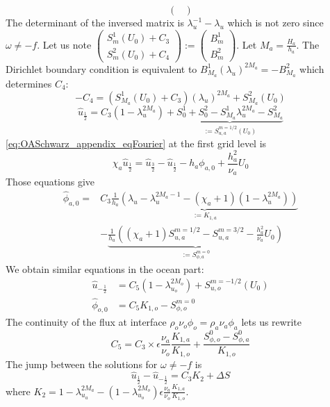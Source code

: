 \begin{itemize}
\begin{equation}
\begin{pmatrix}
	\end{pmatrix}
\end{equation}
The determinant of the inversed matrix is
$\lambda_u^{-1} - \lambda_u$ which is not zero since
$\omega\neq -f$.
Let us note 
$\begin{pmatrix}
	S_m^1(U_0) + {C}_3\\
	S_m^2(U_0) + {C}_4
\end{pmatrix}:=\begin{pmatrix}
B_m^1\\
B_m^2
\end{pmatrix}$.
Let $M_a=\frac{H_a}{h_a}$.
The Dirichlet boundary condition is equivalent to
$B_{M_a}^1 (\lambda_u)^{2M_a} = - B_{M_a}^2$ which determines
${C}_4$:
\begin{equation}
- {C}_4 = \left(S_{M_a}^1(U_0) + {C}_3\right)
	(\lambda_u)^{2M_a} + S_{M_a}^2(U_0)
\end{equation}
\begin{equation}
		\widehat{u}_{\frac{1}{2}} = {C}_3 (1 - \lambda_u^{2M_a})
	+ \underbrace{S_0^1+S_0^2 - S_{M_a}^1 \lambda_u^{2M_a}
		-S_{M_a}^2}_{:=S_{u, a}^{m=1/2}(U_0)}
\end{equation}
\eqref{eq:OASchwarz_appendix_eqFourier} at the first grid level is
\begin{equation}
	\chi_a \widehat{u}_{\frac{1}{2}} =
	\widehat{u}_{\frac{3}{2}} - \widehat{u}_{\frac{1}{2}}
	- h_a \phi_{a,0} + \frac{h^2_a}{\nu_a} U_0
\end{equation}
Those equations give
\begin{equation}
	\begin{aligned}
		\widehat{\phi}_{a,0} =&{C}_3 \underbrace{\frac{1}{h_a}
		\left(
			\lambda_u-\lambda_u^{2M_a-1}
			- (\chi_a+1)(1-\lambda_u^{2M_a})
			\right)}_{:=K_{1,a}}\\
		&-\underbrace{\frac{1}{h_a}\left((\chi_a + 1) S_{u,a}^{m=1/2}
		- S_{u,a}^{m=3/2}
		- \frac{h_a^2}{\nu_a} U_0\right)}_{:=S_{\phi,a}^{m=0}}
	\end{aligned}
\end{equation}
We obtain similar equations in the ocean part:
\begin{equation}
	\begin{aligned}
		\widehat{u}_{-\frac{1}{2}} &= {C}_5 (1 -
			\lambda_{u_o}^{2M_o})
			+ S_{u, o}^{m=-1/2}(U_0) \\
		\widehat{\phi}_{o,0} &={C}_5 K_{1,o}
		-S_{\phi,o}^{m=0}
	\end{aligned}
\end{equation}
The continuity of the flux at interface
$\rho_o \nu_o \phi_o = \rho_a \nu_a \phi_a$ lets us rewrite
\begin{equation}
{C}_5 = {C}_3 \times \epsilon
	\frac{\nu_a}{\nu_o} \frac{K_{1,a}}{K_{1,o}} +
	\frac{S_{\phi,o}^0 - S^0_{\phi, a}}{K_{1,o}}
\end{equation}
The jump between the solutions for $\omega\neq -f$ is
\begin{equation}
	\widehat{u}_{\frac{1}{2}} - \widehat{u}_{-\frac{1}{2}}
	= {C}_3 K_{2} + \Delta S
\end{equation}
where $K_{2} = 1 - \lambda_{u_a}^{2M_a} - (1 - \lambda_{u_o}^{2M_o})
\epsilon \frac{\nu_a}{\nu_o} \frac{K_{1,a}}{K_{1,o}}$.
\end{itemize}
